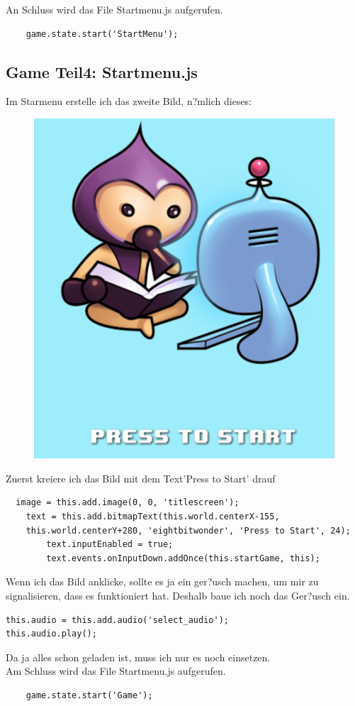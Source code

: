 \documentclass{article}
\begin{document}
An Schluss wird das File Startmenu.js aufgerufen.\\


\begin{lstlisting}
    game.state.start('StartMenu');
\end{lstlisting}

\cleardoublepage
\subsection{Game Teil4: Startmenu.js}

Im Starmenu erstelle ich das zweite Bild, n?mlich dieses:

\begin{figure}[ht]
    \centering
    \includegraphics[width=.3\linewidth]{foto}
    \caption{}
    \label{fig:sub1}
    \end{figure}

Zuerst kreiere ich das Bild mit dem Text'Press to Start' drauf
\begin{lstlisting}
  image = this.add.image(0, 0, 'titlescreen');
    text = this.add.bitmapText(this.world.centerX-155,
    this.world.centerY+280, 'eightbitwonder', 'Press to Start', 24);
        text.inputEnabled = true;
        text.events.onInputDown.addOnce(this.startGame, this);
\end{lstlisting}

Wenn ich das Bild anklicke, sollte es ja ein ger?usch machen, um mir zu signalisieren, dass es funktioniert hat.
Deshalb baue ich noch das Ger?usch ein.

\begin{lstlisting}
this.audio = this.add.audio('select_audio');
this.audio.play();
\end{lstlisting}
Da ja alles schon geladen ist, muss ich nur es noch einsetzen.\\
Am Schluss wird das File Startmenu.js aufgerufen.\\

\begin{lstlisting}
    game.state.start('Game');
\end{lstlisting}
\end{document}
